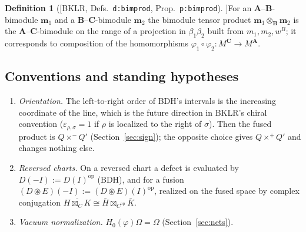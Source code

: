 \documentclass[11pt]{article}
\theoremstyle{definition}
\newtheorem{definition}[theorem]{Definition}
\theoremstyle{remark}
\newcommand{\Om}{\Omega}
\newcommand{\bfB}{\mathbf B}
\newcommand{\bfA}{\mathbf A}
\newcommand{\bfC}{\mathbf C}
\newcommand{\fus}{\boxtimes}
\newcommand{\cfus}{\circledast}
\begin{document}
\begin{definition}[{[BKLR, Defs.~\texttt{d:bimprod}, Prop.~\texttt{p:bimprod}}]]\label{def:bimprod}
For an $\bfA$--$\bfB$-bimodule $\mathbf m_1$ and a $\bfB$--$\bfC$-bimodule $\mathbf m_2$ the bimodule tensor product $\mathbf m_1\otimes_{\bfB}\mathbf m_2$ is the $\bfA$--$\bfC$-bimodule on the range of a projection in $\beta_1\beta_2$ built from $m_1,m_2,w^B$; it corresponds to composition of the homomorphisms $\varphi_1\circ\varphi_2\colon M^{\bfC}\to M^{\bfA}$.
\end{definition}



\subsection{Conventions and standing hypotheses}\label{sec:conv}
\begin{enumerate}[label=\textbf{C\arabic*}.,leftmargin=2.2em]
\item \emph{Orientation.} The left-to-right order of BDH's intervals is the increasing coordinate of the line, which is the future direction in BKLR's chiral convention ($\varepsilon_{\rho,\sigma}=1$ if $\rho$ is localized to the right of $\sigma$). Then the fused product is $Q\times^-Q'$ (Section~\ref{sec:sign}); the opposite choice gives $Q\times^+Q'$ and changes nothing else.
\item \emph{Reversed charts.} On a reversed chart a defect is evaluated by $D(-I):=D(I)^{\mathrm{op}}$ (BDH), and for a fusion $(D\cfus E)(-I):=(D\cfus E)(I)^{\mathrm{op}}$, realized on the fused space by complex conjugation $\overline{H\fus_CK}\cong\bar H\fus_{C^{\mathrm{op}}}\bar K$.
\item \emph{Vacuum normalization.} $H_0(\varphi)\Om=\Om$ (Section~\ref{sec:nets}).
\end{enumerate}
\end{document}
